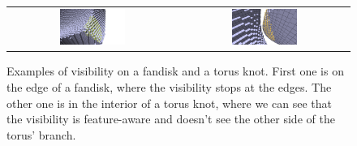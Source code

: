 \begin{figure}
  \centering
  \begin{tabular}{c c}
    \includegraphics[width=0.4\textwidth]{pictures/visibility_from_given_point_r_10} &
    \includegraphics[width=0.4\textwidth]{pictures/visibility_aware_of_features}
  \end{tabular}
  \caption{Examples of visibility on a fandisk and a torus knot. First one is on the edge
    of a fandisk, where the visibility stops at the edges. The other one is in the interior
    of a torus knot, where we can see that the visibility is feature-aware and doesn't see
    the other side of the torus' branch.}
  \label{fig:visibility-results}
\end{figure}
%




